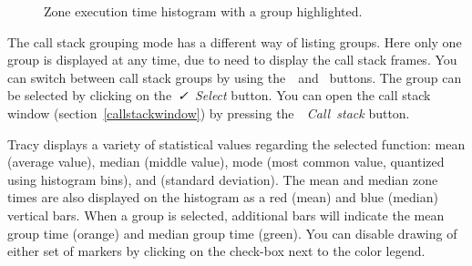 \documentclass[hidelinks,titlepage,a4paper]{article}
\begin{document}
\begin{figure}[h]
\centering{}
\caption{Zone execution time histogram with a group highlighted.}
\label{findzonehistogramgroup}
\end{figure}

The call stack grouping mode has a different way of listing groups. Here only one group is displayed at any time, due to need to display the call stack frames. You can switch between call stack groups by using the~\faCaretLeft{}~and~\faCaretRight{} buttons. The group can be selected by clicking on the~\emph{\faCheck{}~Select} button. You can open the call stack window (section~\ref{callstackwindow}) by pressing the~\emph{\faAlignJustify{}~Call~stack} button.

Tracy displays a variety of statistical values regarding the selected function: mean (average value), median (middle value), mode (most common value, quantized using histogram bins), and \textsigma{} (standard deviation). The mean and median zone times are also displayed on the histogram as a red (mean) and blue (median) vertical bars. When a group is selected, additional bars will indicate the mean group time (orange) and median group time (green). You can disable drawing of either set of markers by clicking on the check-box next to the color legend.
\end{document}
